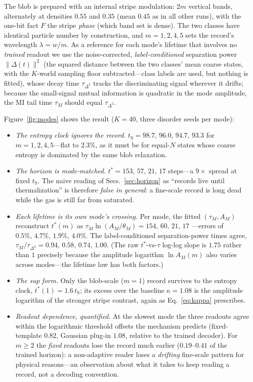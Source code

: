 \documentclass[aps,pre,twocolumn,superscriptaddress,nofootinbib,longbibliography]{revtex4-2}
\newcommand{\tS}{t_{\mathrm{S}}}
\newcommand{\tstar}{t^{*}}
\newcommand{\kap}{\kappa}
\begin{document}
The blob is prepared with an internal stripe modulation: $2m$ vertical bands, alternately
at densities $0.55$ and $0.35$ (mean $0.45$ as in all other runs), with the one-bit fact
$F$ the stripe \emph{phase} (which band set is dense). The two classes have identical
particle number by construction, and $m=1,2,4,5$ sets the record's wavelength
$\lambda=w/m$. As a reference for each mode's lifetime that involves no \emph{trained}
readout we use the noise-corrected, \emph{label-conditioned} separation power
$\|\Delta(t)\|^2$ (the squared distance between the two classes' mean coarse states, with
the $K$-world sampling floor subtracted---class labels are used, but nothing is fitted),
whose decay time $\tau_{\Delta^2}$ tracks the discriminating signal wherever it drifts;
because
the small-signal mutual information is quadratic in the mode amplitude, the MI tail time
$\tau_M$ should equal $\tau_{\Delta^2}$.

Figure~\ref{fig:modes} shows the result ($K=40$, three disorder seeds per mode):

\begin{itemize}
\item \emph{The entropy clock ignores the record.} $\tS = 98.7,\,96.0,\,94.7,\,93.3$ for
$m=1,2,4,5$---flat to $2.3\%$, as it must be for equal-$N$ states whose coarse entropy is
dominated by the same blob relaxation.
\item \emph{The horizon is mode-matched.} $\tstar = 153,\,57,\,21,\,17$ steps---a
$9\times$ spread at fixed $\tS$. The naive reading of Secs.~\ref{sec:horizon} as ``records
live until thermalization'' is therefore \emph{false in general}: a fine-scale record is
long dead while the gas is still far from saturated.
\item \emph{Each lifetime is its own mode's crossing.} Per mode, the fitted
$(\tau_M,A_M)$ reconstruct $\tstar(m)$ as $\tau_M\ln(A_M/\theta_M) = 154,\,60,\,21,\,17$
---errors of $0.5\%,\,4.7\%,\,1.9\%,\,4.0\%$. The label-conditioned separation-power times agree,
$\tau_M/\tau_{\Delta^2}=0.94,\,0.58,\,0.74,\,1.00$. (The raw $\tstar$-vs-$\tau$ log-log
slope is $1.75$ rather than $1$ precisely because the amplitude logarithm $\ln A_M(m)$
also varies across modes---the lifetime law has both factors.)
\item \emph{The sup form.} Only the blob-scale ($m=1$) record survives to the entropy
clock, $\tstar(1)=1.6\,\tS$; its excess over the baseline $\kap=1.08$ is the amplitude
logarithm of the stronger stripe contrast, again as Eq.~\eqref{eq:kappa} prescribes.
\item \emph{Readout dependence, quantified.} At the slowest mode the three readouts agree
within the logarithmic threshold offsets the mechanism predicts (fixed-template $0.82$,
Gaussian plug-in $1.08$, relative to the trained decoder). For $m\ge2$ the \emph{fixed}
readouts lose the record much earlier ($0.19$--$0.41$ of the trained horizon): a
non-adaptive reader loses a \emph{drifting} fine-scale pattern for physical reasons---an
observation about what it takes to keep reading a record, not a decoding convention.
\end{itemize}
\end{document}
